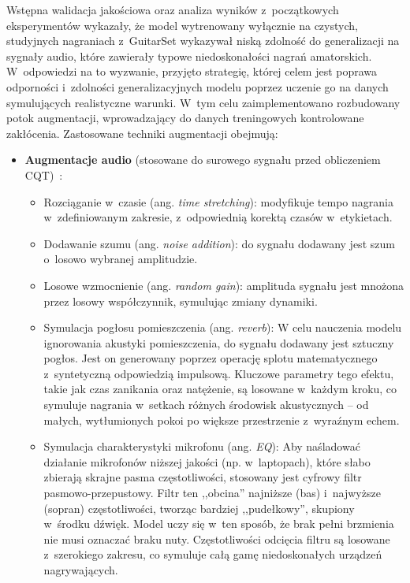Wstępna walidacja jakościowa oraz analiza wyników z~początkowych eksperymentów wykazały, że model wytrenowany wyłącznie na czystych, studyjnych nagraniach z~GuitarSet wykazywał niską zdolność do generalizacji na sygnały audio, które zawierały typowe niedoskonałości nagrań amatorskich. W~odpowiedzi na to wyzwanie, przyjęto strategię, której celem jest poprawa odporności i~zdolności generalizacyjnych modelu poprzez uczenie go na danych symulujących realistyczne warunki. W~tym celu zaimplementowano rozbudowany potok augmentacji, wprowadzający do danych treningowych kontrolowane zakłócenia. Zastosowane techniki augmentacji obejmują:

\begin{itemize}
    \item \textbf{Augmentacje audio} (stosowane do surowego sygnału przed obliczeniem CQT)~\autocite{KlapuriDavy2006SignalProcessing, Benetos2019AutomaticMusicTranscription}:
    \begin{itemize}
        \item Rozciąganie w~czasie (ang. \textit{time stretching}): modyfikuje tempo nagrania w~zdefiniowanym zakresie, z~odpowiednią korektą czasów w~etykietach.
        \item Dodawanie szumu (ang. \textit{noise addition}): do sygnału dodawany jest szum o~losowo wybranej amplitudzie.
        \item Losowe wzmocnienie (ang. \textit{random gain}): amplituda sygnału jest mnożona przez losowy współczynnik, symulując zmiany dynamiki.
        \item Symulacja pogłosu pomieszczenia (ang. \textit{reverb}): W celu nauczenia modelu ignorowania akustyki pomieszczenia, do sygnału dodawany jest sztuczny pogłos. Jest on generowany poprzez operację splotu matematycznego z~syntetyczną odpowiedzią impulsową. Kluczowe parametry tego efektu, takie jak czas zanikania oraz natężenie, są losowane w~każdym kroku, co symuluje nagrania w~setkach różnych środowisk akustycznych – od małych, wytłumionych pokoi po większe przestrzenie z~wyraźnym echem.
        \item Symulacja charakterystyki mikrofonu (ang. \textit{EQ}): Aby naśladować działanie mikrofonów niższej jakości (np. w~laptopach), które słabo zbierają skrajne pasma częstotliwości, stosowany jest cyfrowy filtr pasmowo-przepustowy. Filtr ten ,,obcina'' najniższe (bas) i~najwyższe (sopran) częstotliwości, tworząc bardziej ,,pudełkowy'', skupiony w~środku dźwięk. Model uczy się w~ten sposób, że brak pełni brzmienia nie musi oznaczać braku nuty. Częstotliwości odcięcia filtru są losowane z~szerokiego zakresu, co symuluje całą gamę niedoskonałych urządzeń nagrywających.

\end{itemize}
\end{itemize}
